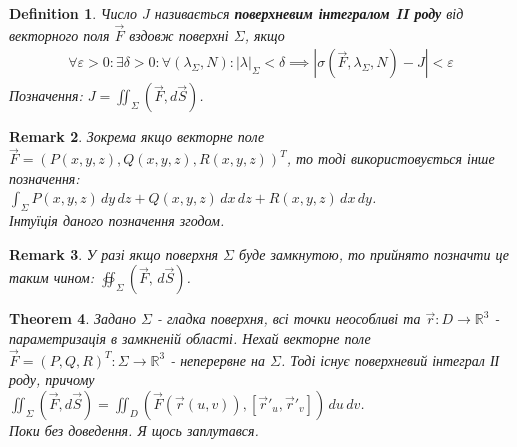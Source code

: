 \documentclass[a4paper, 10pt]{article}
\makeatletter
\def\qed{$\blacksquare$}
\theoremstyle{theoremdd}
\newtheorem{theorem}{Theorem}[subsection]
\theoremstyle{theoremdd}
\newtheorem{definition}[theorem]{Definition}
\theoremstyle{theoremdd}
\theoremstyle{theoremdd}
\theoremstyle{theoremdd}
\theoremstyle{theoremdd}
\theoremstyle{theoremdd}
\theoremstyle{theoremdd}
\theoremstyle{theoremdd}
\theoremstyle{theoremdd}
\theoremstyle{theoremdd}
\newtheorem{remark}[theorem]{Remark}
\theoremstyle{theoremdd}
\theoremstyle{theoremdd}
\theoremstyle{theoremdd}
\theoremstyle{theoremdd}
\renewenvironment{proof}[1][Proof.\\]{\par
\pushQED{\hfill \qed}%
\normalfont \topsep6\p@\@plus6\p@\relax
\trivlist
\item\relax
{\bfseries
#1\@addpunct{.}}\hspace\labelsep\ignorespaces
}{%
\popQED\endtrivlist\@endpefalse
}
\newcommand\Norm[1]{\left\lVert#1\right\rVert}
\makeatother
\begin{document}
\begin{definition}
Число $J$ називається \textbf{поверхневим інтегралом II роду} від векторного поля $\vec{F}$ вздовж поверхні $\Sigma$, якщо
\begin{align*}
\forall \varepsilon > 0: \exists \delta > 0: \forall (\lambda_\Sigma, N): |\lambda|_\Sigma < \delta \implies |\sigma(\vec{F},\lambda_\Sigma, N) - J| < \varepsilon
\end{align*}
Позначення: $J = \displaystyle\iint_\Sigma (\vec{F}, d\vec{S})$.
\end{definition}

\begin{remark}
Зокрема якщо векторне поле $\vec{F} = ( P(x,y,z), Q(x,y,z), R(x,y,z) )^T$, то тоді використовується інше позначення:\\
$\displaystyle\int_\Sigma P(x,y,z)\,dy\,dz + Q(x,y,z)\,dx\,dz + R(x,y,z)\,dx\,dy$.\\
Інтуїція даного позначення згодом.
\end{remark}

\begin{remark}
У разі якщо поверхня $\Sigma$ буде замкнутою, то прийнято позначти це таким чином: $\displaystyle\oiint_{\Sigma} (\vec{F}, \,d\vec{S})$.
\end{remark}

\begin{theorem}
Задано $\Sigma$ - гладка поверхня, всі точки неособливі та $\vec{r}: D \to \mathbb{R}^3$ - параметризація в замкненій області. Нехай векторне поле $\vec{F} = (P,Q,R)^T: \Sigma \to \mathbb{R}^3$ - неперервне на $\Sigma$. Тоді існує поверхневий інтеграл ІІ роду, причому\\
$\displaystyle\iint_\Sigma (\vec{F},d\vec{S}) = \iint_D \left(\vec{F}(\vec{r}(u,v)), [\vec{r}'_u, \vec{r}'_v]\right)\,du\,dv$.\\
\textit{Поки без доведення. Я щось заплутався.}
\end{theorem}

\iffalse
\begin{proof}
Спочатку зауважимо, що $\vec{n} = \dfrac{[\vec{r}'_u, \vec{r}'_v]}{\Norm{[\vec{r}'_u, \vec{r}'_v]}}$. А також треба побачити, що $\overrightarrow{T^*_{N_i} \Sigma(v_1,v_2)} = \vec{n} \cdot S(T^*_{N_i} \Sigma(v_1,v_2))$. Але ось ця площа - це фактично площа паралелограму, а це ж є норма векторного добутку. Таким чином,\\
$(\vec{F},\overrightarrow{T^*_{N_i} \Sigma(v_1,v_2)}) = (\vec{F}, [\vec{r}'_u, \vec{r}'_v ])$
\end{proof}
\fi
\end{document}
